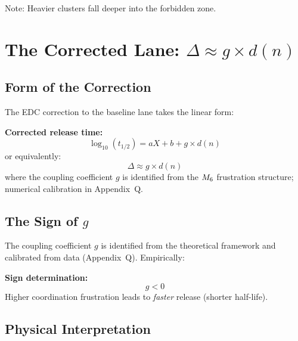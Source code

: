 \noindent
Note: Heavier clusters fall deeper into the forbidden zone. \tagCal

\section{The Corrected Lane: $\Delta \approx g \times d(n)$}
\label{sec:frustrated:corrected}

\subsection{Form of the Correction}

The EDC correction to the baseline lane takes the linear form:

\begin{derivationbox}
    \textbf{Corrected release time:}
    \begin{equation}
        \log_{10}(t_{1/2}) = a X + b + g \times d(n)
        \label{eq:f:corrected_lane}
    \end{equation}
    or equivalently:
    \begin{equation}
        \Delta \approx g \times d(n)
        \label{eq:f:delta_g}
    \end{equation}
    where the coupling coefficient $g$ is identified \tagI{} from the
    $M_6$ frustration structure; numerical calibration in Appendix~Q.
    \tagP
\end{derivationbox}

\subsection{The Sign of $g$}

The coupling coefficient $g$ \tagI{} is identified from the theoretical framework
and calibrated from data (Appendix~Q). Empirically:

\begin{resultbox}
    \textbf{Sign determination:}
    \begin{equation}
        g < 0
    \end{equation}
    Higher coordination frustration leads to \emph{faster} release
    (shorter half-life).
    \tagCal
\end{resultbox}

\subsection{Physical Interpretation}

